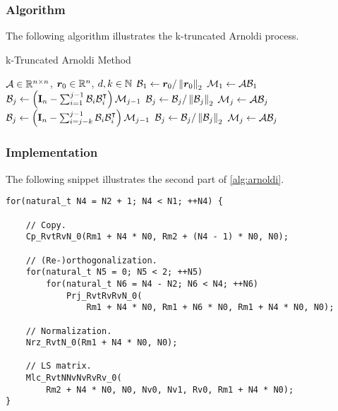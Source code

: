 \begin{frame}[fragile]
    \frametitle{Algorithm}

    The following algorithm illustrates the k-truncated Arnoldi process.

    \begin{algorithm}[H]
    \caption{k-Truncated Arnoldi Method} \label{alg:arnoldi}
    \begin{algorithmic}
    \Require $\mathcal{A} \in \mathbb{R}^{n \times n}$, $\bm{r}_0 \in \mathbb{R}^{n}$, $d, k \in \mathbb{N}$
    \State $\mathcal{B}_1 \gets \bm{r}_0 / \left\lVert \bm{r}_0 \right\rVert_2$
    \State $\mathcal{M}_1 \gets \mathcal{A} \mathcal{B}_1$
        \State $\mathcal{B}_j \gets \left( \mathbf{I}_n - \sum_{i=1}^{j-1} \mathcal{B}_i \mathcal{B}_i^{\intercal} \right) \mathcal{M}_{j-1}$
        \State $\mathcal{B}_j \gets \mathcal{B}_j / \left\lVert \mathcal{B}_j \right\rVert_2$
        \State $\mathcal{M}_j \gets \mathcal{A} \mathcal{B}_j$
    \EndFor
        \State $\mathcal{B}_j \gets \left( \mathbf{I}_n - \sum_{i=j-k}^{j-1} \mathcal{B}_i \mathcal{B}_i^{\intercal} \right) \mathcal{M}_{j-1}$
        \State $\mathcal{B}_j \gets \mathcal{B}_j / \left\lVert \mathcal{B}_j \right\rVert_2$
        \State $\mathcal{M}_j \gets \mathcal{A} \mathcal{B}_j$
    \EndFor
    \end{algorithmic}
    \end{algorithm}

\end{frame}

\begin{frame}[fragile]
    \frametitle{Implementation}

    The following snippet illustrates the second part of \cref{alg:arnoldi}.

\begin{lstlisting}[style=cpp]
for(natural_t N4 = N2 + 1; N4 < N1; ++N4) {

    // Copy.
    Cp_RvtRvN_0(Rm1 + N4 * N0, Rm2 + (N4 - 1) * N0, N0);

    // (Re-)orthogonalization.
    for(natural_t N5 = 0; N5 < 2; ++N5)
        for(natural_t N6 = N4 - N2; N6 < N4; ++N6)
            Prj_RvtRvRvN_0(
                Rm1 + N4 * N0, Rm1 + N6 * N0, Rm1 + N4 * N0, N0);

    // Normalization.
    Nrz_RvtN_0(Rm1 + N4 * N0, N0);

    // LS matrix.
    Mlc_RvtNNvNvRvRv_0(
        Rm2 + N4 * N0, N0, Nv0, Nv1, Rv0, Rm1 + N4 * N0);
}
\end{lstlisting}

\end{frame}